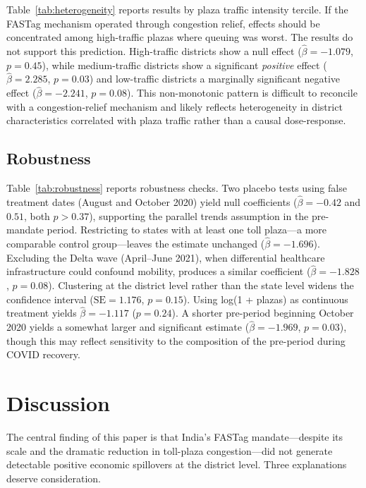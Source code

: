 \documentclass[12pt]{article}
\begin{document}
Table~\ref{tab:heterogeneity} reports results by plaza traffic intensity tercile. If the FASTag mechanism operated through congestion relief, effects should be concentrated among high-traffic plazas where queuing was worst. The results do not support this prediction. High-traffic districts show a null effect ($\hat{\beta} = -1.079$, $p = 0.45$), while medium-traffic districts show a significant \textit{positive} effect ($\hat{\beta} = 2.285$, $p = 0.03$) and low-traffic districts a marginally significant negative effect ($\hat{\beta} = -2.241$, $p = 0.08$). This non-monotonic pattern is difficult to reconcile with a congestion-relief mechanism and likely reflects heterogeneity in district characteristics correlated with plaza traffic rather than a causal dose-response.

\subsection{Robustness}



Table~\ref{tab:robustness} reports robustness checks. Two placebo tests using false treatment dates (August and October 2020) yield null coefficients ($\hat{\beta} = -0.42$ and $0.51$, both $p > 0.37$), supporting the parallel trends assumption in the pre-mandate period. Restricting to states with at least one toll plaza---a more comparable control group---leaves the estimate unchanged ($\hat{\beta} = -1.696$). Excluding the Delta wave (April--June 2021), when differential healthcare infrastructure could confound mobility, produces a similar coefficient ($\hat{\beta} = -1.828$, $p = 0.08$). Clustering at the district level rather than the state level widens the confidence interval ($\text{SE} = 1.176$, $p = 0.15$). Using log(1 + plazas) as continuous treatment yields $\hat{\beta} = -1.117$ ($p = 0.24$). A shorter pre-period beginning October 2020 yields a somewhat larger and significant estimate ($\hat{\beta} = -1.969$, $p = 0.03$), though this may reflect sensitivity to the composition of the pre-period during COVID recovery.

\section{Discussion}

The central finding of this paper is that India's FASTag mandate---despite its scale and the dramatic reduction in toll-plaza congestion---did not generate detectable positive economic spillovers at the district level. Three explanations deserve consideration.
\end{document}
